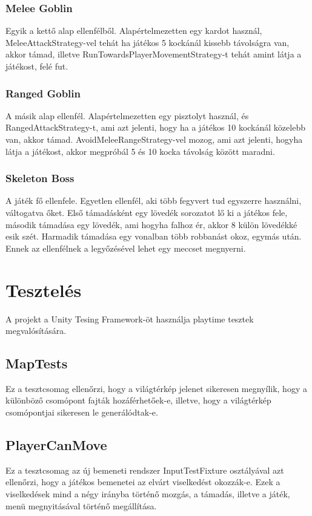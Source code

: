 \documentclass[
]{thesis-ekf}
\theoremstyle{definition}
\theoremstyle{remark}
\begin{document}
	\subsection{Melee Goblin}
	Egyik a kettő alap ellenfélből. Alapértelmezetten egy kardot használ, MeleeAttackStrategy-vel tehát ha játékos 5 kockánál kissebb távolságra van, akkor támad, illetve RunTowardsPlayerMovementStrategy-t tehát amint látja a játékost, felé fut. 
	\subsection{Ranged Goblin}
	A másik alap ellenfél. Alapértelmezetten egy pisztolyt használ, és RangedAttackStrategy-t, ami azt jelenti, hogy ha a játékos 10 kockánál közelebb van, akkor támad. AvoidMeleeRangeStrategy-vel mozog, ami azt jelenti, hogyha látja a játékost, akkor megpróbál 5 és 10 kocka távolság között maradni.
	\subsection{Skeleton Boss}
	A játék fő ellenfele. Egyetlen ellenfél, aki több fegyvert tud egyszerre használni, váltogatva őket. Első támadásként egy lövedék sorozatot lő ki a játékos fele, második támadása egy lövedék, ami hogyha falhoz ér, akkor 8 külön lövedékké esik szét. Harmadik támadása egy vonalban több robbanást okoz, egymás után. Ennek az ellenfélnek a legyőzésével lehet egy meccset megnyerni.
	
	\chapter{Tesztelés}
	A projekt a Unity Tesing Framework-öt használja playtime tesztek megvalósítására.
	\section{MapTests}
	Ez a tesztcsomag ellenőrzi, hogy a világtérkép jelenet sikeresen megnyílik, hogy a különböző csomópont fajták hozáférhetőek-e, illetve, hogy a világtérkép csomópontjai sikeresen le generálódtak-e.
	\section{PlayerCanMove}
	Ez a tesztcsomag az új bemeneti rendszer InputTestFixture osztályával azt ellenőrzi, hogy a játékos bemenetei az elvárt viselkedést okozzák-e. Ezek a viselkedések mind a négy irányba történő mozgás, a támadás, illetve a játék, menü megnyitásával történő megállítása.
\end{document}

